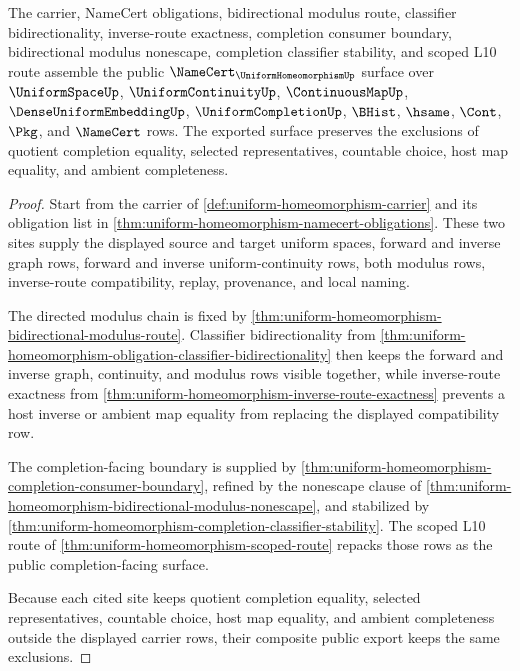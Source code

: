 \begin{theorem}
\label{thm:uniform-homeomorphism-public-export}
The carrier, NameCert obligations, bidirectional modulus route, classifier bidirectionality, inverse-route exactness, completion consumer boundary, bidirectional modulus nonescape, completion classifier stability, and scoped L10 route assemble the public $\NameCert_{\UniformHomeomorphismUp}$ surface over $\UniformSpaceUp$, $\UniformContinuityUp$, $\ContinuousMapUp$, $\DenseUniformEmbeddingUp$, $\UniformCompletionUp$, $\BHist$, $\hsame$, $\Cont$, $\Pkg$, and $\NameCert$ rows. The exported surface preserves the exclusions of quotient completion equality, selected representatives, countable choice, host map equality, and ambient completeness.
\end{theorem}
\begin{proof}
Start from the carrier of \autoref{def:uniform-homeomorphism-carrier} and its obligation list in \autoref{thm:uniform-homeomorphism-namecert-obligations}. These two sites supply the displayed source and target uniform spaces, forward and inverse graph rows, forward and inverse uniform-continuity rows, both modulus rows, inverse-route compatibility, replay, provenance, and local naming.

The directed modulus chain is fixed by \autoref{thm:uniform-homeomorphism-bidirectional-modulus-route}. Classifier bidirectionality from \autoref{thm:uniform-homeomorphism-obligation-classifier-bidirectionality} then keeps the forward and inverse graph, continuity, and modulus rows visible together, while inverse-route exactness from \autoref{thm:uniform-homeomorphism-inverse-route-exactness} prevents a host inverse or ambient map equality from replacing the displayed compatibility row.

The completion-facing boundary is supplied by \autoref{thm:uniform-homeomorphism-completion-consumer-boundary}, refined by the nonescape clause of \autoref{thm:uniform-homeomorphism-bidirectional-modulus-nonescape}, and stabilized by \autoref{thm:uniform-homeomorphism-completion-classifier-stability}. The scoped L10 route of \autoref{thm:uniform-homeomorphism-scoped-route} repacks those rows as the public completion-facing surface.

Because each cited site keeps quotient completion equality, selected representatives, countable choice, host map equality, and ambient completeness outside the displayed carrier rows, their composite public export keeps the same exclusions.
\end{proof}

